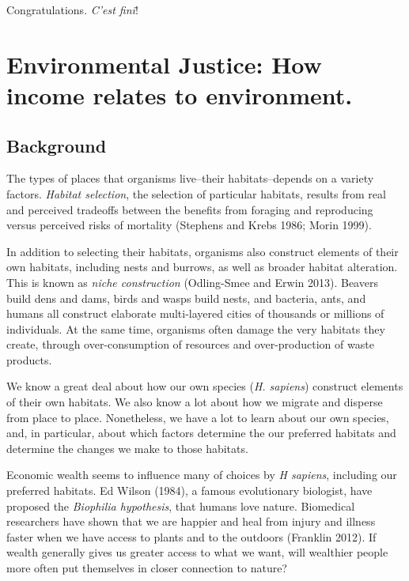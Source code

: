 \documentclass[
  letterpaper,
  DIV=11,
  numbers=noendperiod]{scrreprt}
\begin{document}
Congratulations. \emph{C'est fini}!


\chapter{Environmental Justice: How income relates to
environment.}\label{environmental-justice-how-income-relates-to-environment.}

\section{Background}\label{background-2}

The types of places that organisms live--their habitats--depends on a
variety factors. \emph{Habitat selection}, the selection of particular
habitats, results from real and perceived tradeoffs between the benefits
from foraging and reproducing versus perceived risks of mortality
(Stephens and Krebs 1986; Morin 1999).

In addition to selecting their habitats, organisms also construct
elements of their own habitats, including nests and burrows, as well as
broader habitat alteration. This is known as \emph{niche construction}
(Odling-Smee and Erwin 2013). Beavers build dens and dams, birds and
wasps build nests, and bacteria, ants, and humans all construct
elaborate multi-layered cities of thousands or millions of individuals.
At the same time, organisms often damage the very habitats they create,
through over-consumption of resources and over-production of waste
products.

We know a great deal about how our own species (\emph{H. sapiens})
construct elements of their own habitats. We also know a lot about how
we migrate and disperse from place to place. Nonetheless, we have a lot
to learn about our own species, and, in particular, about which factors
determine the our preferred habitats and determine the changes we make
to those habitats.

Economic wealth seems to influence many of choices by \emph{H sapiens},
including our preferred habitats. Ed Wilson (1984), a famous
evolutionary biologist, have proposed the \emph{Biophilia hypothesis},
that humans love nature. Biomedical researchers have shown that we are
happier and heal from injury and illness faster when we have access to
plants and to the outdoors (Franklin 2012). If wealth generally gives us
greater access to what we want, will wealthier people more often put
themselves in closer connection to nature?
\end{document}
